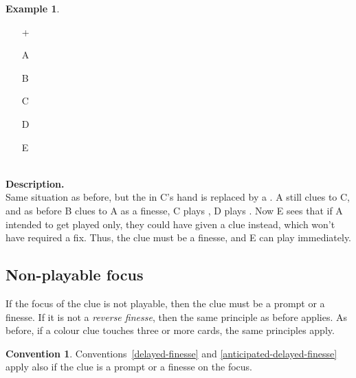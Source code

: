 \documentclass[a4paper]{article}
\theoremstyle{plain}
\theoremstyle{definition}
\newtheorem{example}[theorem]{Example}
\newtheorem{convention}[theorem]{Convention}
\begin{document}
\begin{example}	\hfill \\
	\begin{minipage}{0.45\textwidth}
		\begin{itemize}
			\item[\Large +]      
			\item[\Large A]    
			\item[\Large B]    
			\item[\Large C]    
			\item[\Large D]    
			\item[\Large E]    
		\end{itemize}
	\end{minipage}%
	\begin{minipage}{0.55\textwidth}
		\hfill \\
		
		\textbf{Description.} \\
		
		Same situation as before, but the  in C's hand is replaced by a . A still clues  to C, and as before B clues  to A as a finesse, C plays , D plays . Now E sees that if A intended to get  played only, they could have given a  clue instead, which won't have required a fix. Thus, the  clue must be a finesse, and E can play  immediately.
	\end{minipage}
\end{example} \vspace{0.15 cm}

\subsection{Non-playable focus}

If the focus of the clue is not playable, then the clue must be a prompt or a finesse. If it is not a \emph{reverse finesse}, then the same principle as before applies. As before, if a colour clue touches three or more cards, the same principles apply.

\begin{convention}
	Conventions~\ref{delayed-finesse} and \ref{anticipated-delayed-finesse} apply also if the clue is a prompt or a finesse on the focus.
\end{convention}
\end{document}
